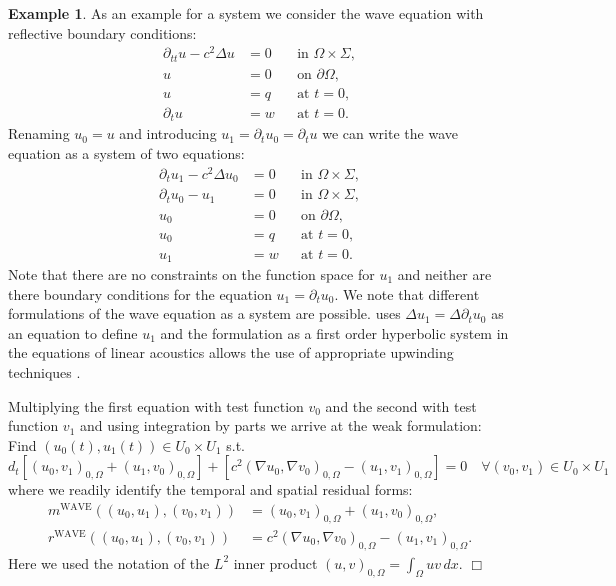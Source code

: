 \documentclass[a4paper,12pt]{article}
\theoremstyle{definition}
\newtheorem{exm}{Example}
\begin{document}
\begin{exm} \label{Exm:WaveEquation}
As an example for a system we consider the wave equation with reflective boundary conditions:
\begin{align*}
\partial_{tt} u-c^2\Delta u  &= 0 &&\text{in $\Omega\times\Sigma$},\\
u &= 0 &&\text{on $\partial\Omega$},\\
u &= q &&\text{at $t=0$},\\
\partial_t u &= w &&\text{at $t=0$}.
\end{align*}
Renaming $u_0=u$ and introducing $u_1=\partial_t u_0 =\partial_t u$ we can write the wave equation
as a system of two equations:
\begin{align*}
\partial_t u_1 - c^2\Delta u_0 &=0 &&\text{in $\Omega\times\Sigma$},\\
\partial_t u_0 - u_1 &=0 &&\text{in $\Omega\times\Sigma$},\\
u_0 &= 0 &&\text{on $\partial\Omega$},\\
u_0 &= q &&\text{at $t=0$},\\
u_1 &= w &&\text{at $t=0$}.
\end{align*}
Note that there are no constraints on the function space for $u_1$
and neither are there boundary conditions for the equation $u_1=\partial_t u_0$.
We note that different formulations of the wave equation as a system are
possible. \cite{Eriksson} uses $\Delta u_1 = \Delta \partial_t u_0$ as
an equation to define $u_1$ and the formulation as a first order hyperbolic
system in the equations of linear acoustics allows the use of appropriate
upwinding techniques \cite{LeVeque}.

Multiplying the first equation with test function $v_0$ and the second with test function $v_1$
and using integration by parts we arrive at the weak formulation: Find $(u_0(t),u_1(t))\in
U_0\times U_1$ s.t.
\begin{equation*}
d_t \left[ (u_0,v_1)_{0,\Omega} + (u_1,v_0)_{0,\Omega}\right]
+ \left[ c^2 (\nabla u_0,\nabla v_0)_{0,\Omega} -(u_1,v_1)_{0,\Omega} \right] = 0
\quad \forall (v_0,v_1)\in U_0\times U_1
\end{equation*}
where we readily identify the temporal and spatial residual forms:
\begin{align*}
m^{\text{WAVE}}((u_0,u_1),(v_0,v_1)) &= (u_0,v_1)_{0,\Omega} + (u_1,v_0)_{0,\Omega},\\
r^{\text{WAVE}}((u_0,u_1),(v_0,v_1)) &= c^2 (\nabla u_0,\nabla v_0)_{0,\Omega} - (u_1,v_1)_{0,\Omega} .
\end{align*}
Here we used the notation of the $L^2$ inner product $(u,v)_{0,\Omega} = \int_\Omega
u v \, dx$.
\hfill$\Box$
\end{exm}
\end{document}
